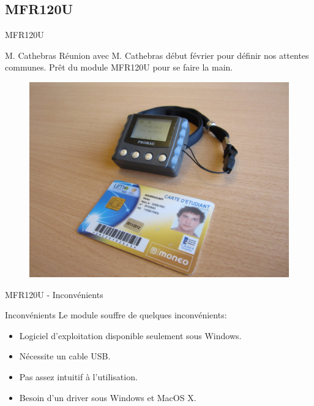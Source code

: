 \subsection{MFR120U}
\begin{frame}{MFR120U}
	\begin{block}{M. Cathebras}
        Réunion avec M. Cathebras début février pour définir nos attentes communes.
        Prêt du module MFR120U pour se faire la main.
	\end{block}

    \begin{figure}[h]
        \begin{center}
            \includegraphics[scale=0.4]{images/mfr.jpg} 
        \end{center}
     \end{figure} 
\end{frame}


\begin{frame}{MFR120U - Inconvénients}
	\begin{block}{Inconvénients}
        Le module souffre de quelques inconvénients:

	    \begin{itemize}
            \item Logiciel d'exploitation disponible seulement sous Windows.
            \item Nécessite un cable USB.
            \item Pas assez intuitif à l'utilisation.
            \item Besoin d'un driver sous Windows et MacOS X.
	    \end{itemize}
	\end{block}
\end{frame}



